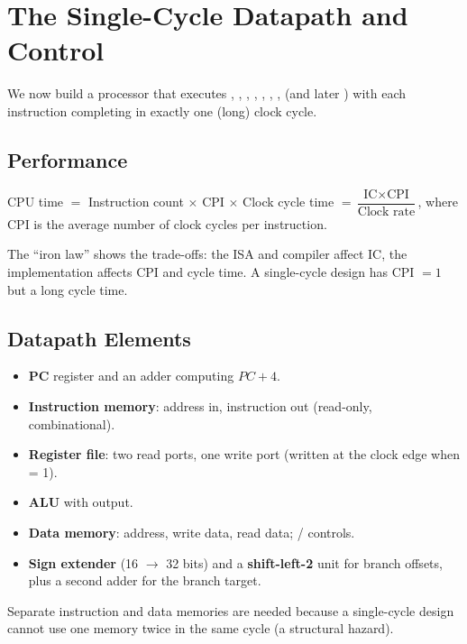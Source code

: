 \chapter{The Single-Cycle Datapath and Control}

We now build a processor that executes , , ,
, , , ,  (and later )
with each instruction completing in exactly one (long) clock cycle.

\section{Performance}

\begin{definition}
CPU time $=$ Instruction count $\times$ CPI $\times$ Clock cycle time
$= \dfrac{\text{IC} \times \text{CPI}}{\text{Clock rate}}$, where CPI is the
average number of clock cycles per instruction.
\end{definition}

The ``iron law'' shows the trade-offs: the ISA and compiler affect IC, the
implementation affects CPI and cycle time. A single-cycle design has
CPI $= 1$ but a long cycle time.

\section{Datapath Elements}

\begin{itemize}
  \item \textbf{PC} register and an adder computing $PC + 4$.
  \item \textbf{Instruction memory}: address in, instruction out
    (read-only, combinational).
  \item \textbf{Register file}: two read ports, one write port (written at
    the clock edge when  = 1).
  \item \textbf{ALU} with  output.
  \item \textbf{Data memory}: address, write data, read data;
    / controls.
  \item \textbf{Sign extender} (16 $\to$ 32 bits) and a \textbf{shift-left-2}
    unit for branch offsets, plus a second adder for the branch target.
\end{itemize}

Separate instruction and data memories are needed because a single-cycle
design cannot use one memory twice in the same cycle (a structural hazard).

